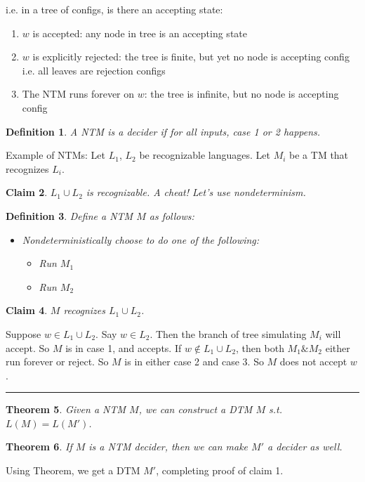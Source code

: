 \documentclass[twoside]{article}
\newcounter{lecnum}
\newtheorem{theorem}{Theorem}[lecnum]
\newtheorem{claim}[theorem]{Claim}
\newtheorem{definition}[theorem]{Definition}
\newenvironment{proof}{{\bf Proof:}}{\hfill\rule{2mm}{2mm}}
\begin{document}
i.e. in a tree of configs, is there an accepting state:
\begin{enumerate}
  \item $w$ is accepted: any node in tree is an accepting state
  \item $w$ is explicitly rejected: the tree is finite, but yet no node is accepting config i.e. all leaves are rejection configs
  \item The NTM runs forever on $w$: the tree is infinite, but no node is accepting config
\end{enumerate}

\begin{definition}
  A NTM is a decider if for all inputs, case 1 or 2 happens.
\end{definition}

Example of NTMs: Let $L_1$, $L_2$ be recognizable languages. Let $M_i$ be a TM that recognizes $L_i$.

\begin{claim}
  $L_1 \cup L_2$ is recognizable. A cheat! Let's use nondeterminism.
\end{claim}

\begin{definition}
  Define a NTM $M$ as follows:
  \begin{itemize}
    \item Nondeterministically choose to do one of the following:
      \begin{itemize}
        \item Run $M_1$
        \item Run $M_2$
      \end{itemize}
    \end{itemize}
\end{definition}

\begin{claim}
  $M$ recognizes $L_1 \cup L_2$.
\end{claim}

\begin{proof}
  Suppose $w \in L_1 \cup L_2$. Say $w \in L_2$. Then the branch of tree simulating $M_i$ will accept. So $M$ is in case 1, and accepts. If $w \notin L_1 \cup L_2$, then both $M_1 \& M_2$ either run forever or reject. So $M$ is in either case 2 and case 3. So $M$ does not accept $w$.
\end{proof}

\begin{theorem}
  Given a NTM $M$, we can construct a DTM $M$ s.t. $L(M) = L(M')$.
\end{theorem}

\begin{theorem}
  If $M$ is a NTM decider, then we can make $M'$ a decider as well.
\end{theorem}

Using Theorem, we get a DTM $M'$, completing proof of claim 1.
\end{document}
